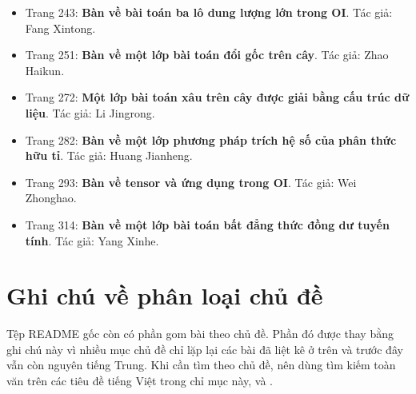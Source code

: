 \documentclass[11pt]{article}
\begin{document}
\begin{itemize}[leftmargin=2em]
  \item Trang 243: \textbf{Bàn về bài toán ba lô dung lượng lớn trong OI}. Tác giả: Fang Xintong.
  \item Trang 251: \textbf{Bàn về một lớp bài toán đổi gốc trên cây}. Tác giả: Zhao Haikun.
  \item Trang 272: \textbf{Một lớp bài toán xâu trên cây được giải bằng cấu trúc dữ liệu}. Tác giả: Li Jingrong.
  \item Trang 282: \textbf{Bàn về một lớp phương pháp trích hệ số của phân thức hữu tỉ}. Tác giả: Huang Jianheng.
  \item Trang 293: \textbf{Bàn về tensor và ứng dụng trong OI}. Tác giả: Wei Zhonghao.
  \item Trang 314: \textbf{Bàn về một lớp bài toán bất đẳng thức đồng dư tuyến tính}. Tác giả: Yang Xinhe.
\end{itemize}

\section{Ghi chú về phân loại chủ đề}

Tệp README gốc còn có phần gom bài theo chủ đề. Phần đó được thay bằng ghi
chú này vì nhiều mục chủ đề chỉ lặp lại các bài đã liệt kê ở trên và trước
đây vẫn còn nguyên tiếng Trung. Khi cần tìm theo chủ đề, nên dùng tìm kiếm
toàn văn trên các tiêu đề tiếng Việt trong chỉ mục này, 
và .
\end{document}
